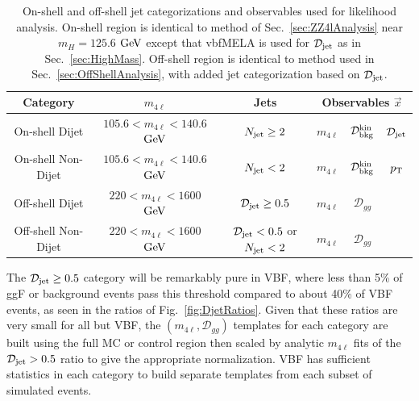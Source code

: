 \begin{table}[htb]
\begin{center}
\begin{tabular}{cccccc}
\hline
Category & $m_{4\ell}$ & Jets & \multicolumn{3}{c}{Observables $\vec{x}$} \\
\hline
\hline
On-shell Dijet & $105.6<m_{4\ell}<140.6$ $\rm{GeV}$ & $N_{\rm jet}\ge2$ & $m_{4\ell}$ & ${\mathcal D}^{\rm kin}_{\rm bkg}$ & ${\mathcal{D}}_{\rm jet}$ \\
On-shell Non-Dijet & $105.6<m_{4\ell}<140.6$ $\rm{GeV}$ & $N_{\rm jet}<2$ & $m_{4\ell}$ & ${\mathcal D}^{\rm kin}_{\rm bkg}$ & ${p}_{\rm T}$ \\
Off-shell Dijet & $220<m_{4\ell}<1600$ $\rm{GeV}$ & ${\mathcal{D}}_{\rm jet}\geq0.5$ & $m_{4\ell}$ & $\mathcal{D}_{gg}$ &  \\
Off-shell Non-Dijet & $220<m_{4\ell}<1600$ $\rm{GeV}$ & ${\mathcal{D}}_{\rm jet}<0.5$ or $N_{\rm jet}<2$ & $m_{4\ell}$ & $\mathcal{D}_{gg}$ &  \\
\hline
\end{tabular}
\caption[Categorizations and Observables Used in On-shell and Off-shell Regions of $f_{\Lambda Q}$ Measurement]{On-shell and off-shell jet categorizations and observables used for likelihood analysis. On-shell region is identical to method of Sec.~\ref{sec:ZZ4lAnalysis} near $m_{H}=125.6$ $\rm{GeV}$ except that vbfMELA is used for $\mathcal{D}_{\rm jet}$ as in Sec.~\ref{sec:HighMass}. Off-shell region is identical to method used in Sec.~\ref{sec:OffShellAnalysis}, with added jet categorization based on $\mathcal{D}_{\rm jet}$.}
\label{tbl:OffShellCatsAndObervs}
\end{center}
\end{table}

The $\mathcal{D}_{\rm jet}\geq0.5$ category will be remarkably pure in VBF, where less than 5\% of ggF or background events pass this threshold compared to about 40\% of VBF events, as seen in the ratios of Fig.~\ref{fig:DjetRatios}. Given that these ratios are very small for all but VBF, the $(m_{4\ell},\mathcal{D}_{gg})$ templates for each category are built using the full MC or control region then scaled by analytic $m_{4\ell}$ fits of the $\mathcal{D}_{\rm jet}>0.5$ ratio to give the appropriate normalization. VBF has sufficient statistics in each category to build separate templates from each subset of simulated events.

